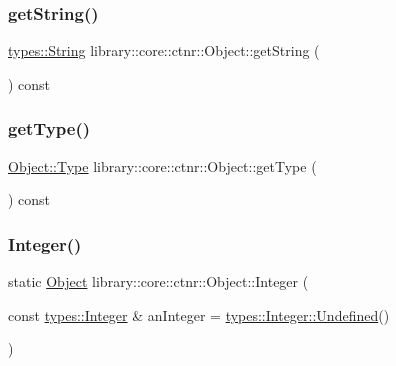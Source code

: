 \subsubsection{\texorpdfstring{get\+String()}{getString()}}
{\footnotesize\ttfamily \hyperlink{classlibrary_1_1core_1_1types_1_1_string}{types\+::\+String} library\+::core\+::ctnr\+::\+Object\+::get\+String (\begin{DoxyParamCaption}{ }\end{DoxyParamCaption}) const}

\mbox{\label{classlibrary_1_1core_1_1ctnr_1_1_object_aa2cc92ae24eb576e0f06af4dce8b7151}} 
\subsubsection{\texorpdfstring{get\+Type()}{getType()}}
{\footnotesize\ttfamily \hyperlink{classlibrary_1_1core_1_1ctnr_1_1_object_a0766006ad111133d70349019551b31d6}{Object\+::\+Type} library\+::core\+::ctnr\+::\+Object\+::get\+Type (\begin{DoxyParamCaption}{ }\end{DoxyParamCaption}) const}

\mbox{\label{classlibrary_1_1core_1_1ctnr_1_1_object_a6746a69f0507b2c7ad8ebdf3d873b083}} 
\subsubsection{\texorpdfstring{Integer()}{Integer()}}
{\footnotesize\ttfamily static \hyperlink{classlibrary_1_1core_1_1ctnr_1_1_object}{Object} library\+::core\+::ctnr\+::\+Object\+::\+Integer (\begin{DoxyParamCaption}\item[{const \hyperlink{classlibrary_1_1core_1_1types_1_1_integer}{types\+::\+Integer} \&}]{an\+Integer = {\ttfamily \hyperlink{classlibrary_1_1core_1_1types_1_1_integer_a142c2df49031b787daf30673c73fcad7}{types\+::\+Integer\+::\+Undefined}()} }\end{DoxyParamCaption})\hspace{0.3cm}{\ttfamily [static]}}


